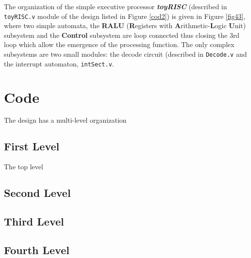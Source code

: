 
The organization of the simple executive processor {\bf {\em toyRISC}} (described in {\tt toyRISC.v} module of the design listed in Figure \ref{cod2}) is given in Figure \ref{fig43}, where two simple automata, the {\bf RALU} ({\bf R}egisters with {\bf A}rithmetic-{\bf L}ogic {\bf U}nit)
subsystem  and  the {\bf Control} subsystem  are loop connected thus closing the 3rd loop which allow the emergence of the processing function. The only complex subsystems are two small modules: the decode circuit (described in {\tt Decode.v} and the interrupt automaton, {\tt intSect.v}.

\section{Code}

The design has a multi-level organization

\subsection{First Level}

The top level


\subsection{Second Level}



\subsection{Third Level}






\subsection{Fourth Level}

